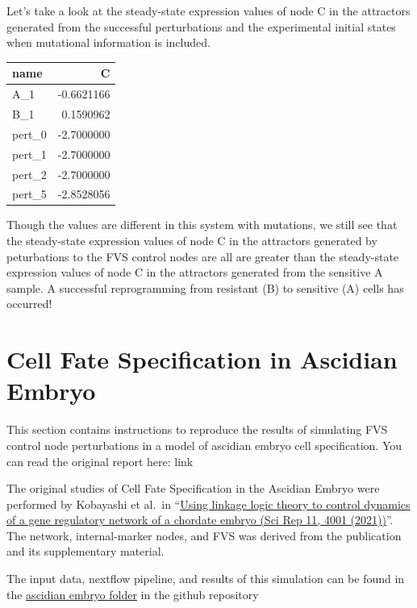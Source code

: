 \documentclass[
]{book}
\begin{document}
Let's take a look at the steady-state expression values of node C in the attractors generated from the successful perturbations and the experimental initial states when mutational information is included.

\begin{tabular}{l|r}
\hline
name & C\\
\hline
A\_1 & -0.6621166\\
\hline
B\_1 & 0.1590962\\
\hline
pert\_0 & -2.7000000\\
\hline
pert\_1 & -2.7000000\\
\hline
pert\_2 & -2.7000000\\
\hline
pert\_5 & -2.8528056\\
\hline
\end{tabular}

Though the values are different in this system with mutations, we still see that the steady-state expression values of node C in the attractors generated by peturbations to the FVS control nodes are all are greater than the steady-state expression values of node C in the attractors generated from the sensitive A sample. A successful reprogramming from resistant (B) to sensitive (A) cells has occurred!

\hypertarget{cell-fate-specification-in-ascidian-embryo}{%
\chapter{Cell Fate Specification in Ascidian Embryo}\label{cell-fate-specification-in-ascidian-embryo}}

This section contains instructions to reproduce the results of simulating FVS control node perturbations in a model of ascidian embryo cell specification. You can read the original report here: link

The original studies of Cell Fate Specification in the Ascidian Embryo were performed by Kobayashi et al.~in ``\href{https://www.nature.com/articles/s41598-021-83045-y}{Using linkage logic theory to control dynamics of a gene regulatory network of a chordate embryo (Sci Rep 11, 4001 (2021))}''. The network, internal-marker nodes, and FVS was derived from the publication and its supplementary material.

The input data, nextflow pipeline, and results of this simulation can be found in the \href{https://github.com/VeraLiconaResearchGroup/Netisce/tree/main/ascidian_embryo_validation}{ascidian embryo folder} in the github repository
\end{document}
